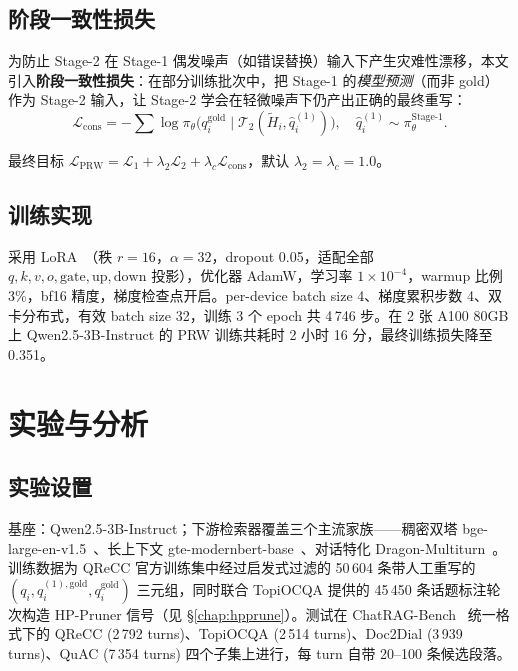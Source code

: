 \subsection{阶段一致性损失}

为防止 Stage-2 在 Stage-1 偶发噪声（如错误替换）输入下产生灾难性漂移，本文引入\textbf{阶段一致性损失}：在部分训练批次中，把 Stage-1 的\emph{模型预测}（而非 gold）作为 Stage-2 输入，让 Stage-2 学会在轻微噪声下仍产出正确的最终重写：
\begin{equation}
\mathcal{L}_{\text{cons}} = -\sum \log \pi_\theta\big(q_i^{\text{gold}} \mid \mathcal{T}_2(\tilde H_i, \hat q_i^{(1)})\big),\quad \hat q_i^{(1)} \sim \pi_\theta^{\text{Stage-1}}.
\end{equation}

最终目标 $\mathcal{L}_{\text{PRW}} = \mathcal{L}_1 + \lambda_2 \mathcal{L}_2 + \lambda_c \mathcal{L}_{\text{cons}}$，默认 $\lambda_2=\lambda_c=1.0$。

\subsection{训练实现}

采用 LoRA~\citep{lora2022}（秩 $r=16$，$\alpha=32$，dropout 0.05，适配全部 $q,k,v,o,\text{gate},\text{up},\text{down}$ 投影），优化器 AdamW，学习率 $1\!\times\!10^{-4}$，warmup 比例 3\%，bf16 精度，梯度检查点开启。per-device batch size 4、梯度累积步数 4、双卡分布式，有效 batch size 32，训练 3 个 epoch 共 4\,746 步。在 2 张 A100 80GB 上 Qwen2.5-3B-Instruct 的 PRW 训练共耗时 2 小时 16 分，最终训练损失降至 0.351。

\section{实验与分析}
\label{sec:prw_exp}

\subsection{实验设置}

基座：Qwen2.5-3B-Instruct；下游检索器覆盖三个主流家族——稠密双塔 bge-large-en-v1.5~\citep{xiao2023cpack}、长上下文 gte-modernbert-base~\citep{warner2024modernbert}、对话特化 Dragon-Multiturn~\citep{Liu2024ChatQASG}。训练数据为 QReCC 官方训练集中经过启发式过滤的 50\,604 条带人工重写的 $(q_i, q_i^{(1),\text{gold}}, q_i^{\text{gold}})$ 三元组，同时联合 TopiOCQA 提供的 45\,450 条话题标注轮次构造 HP-Pruner 信号（见 §\ref{chap:hpprune}）。测试在 ChatRAG-Bench~\citep{Liu2024ChatQASG} 统一格式下的 QReCC (2\,792 turns)、TopiOCQA (2\,514 turns)、Doc2Dial (3\,939 turns)、QuAC (7\,354 turns) 四个子集上进行，每 turn 自带 20--100 条候选段落。

